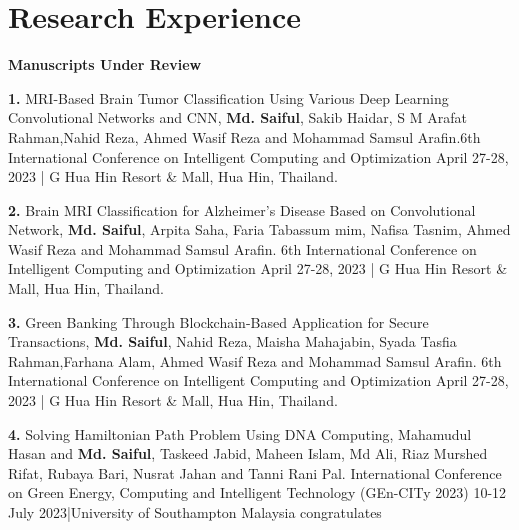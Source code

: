 \documentclass[letterpaper,11pt]{article}
\newcommand{\resumeSubHeadingListStart}{\begin{itemize}[leftmargin=0.15in, label={}]}
\newcommand{\resumeSubHeadingListEnd}{\end{itemize}}
\begin{document}
\section{Research Experience}
  \vspace{4pt}
  {\textbf{Manuscripts Under Review}
  \resumeSubHeadingListStart
    \small{\item{
        \textbf{1. }{ MRI-Based Brain Tumor Classification Using Various Deep Learning Convolutional Networks and CNN, \textbf{Md. Saiful}, Sakib Haidar, S M Arafat Rahman,Nahid Reza, Ahmed Wasif Reza and Mohammad Samsul Arafin.6th International Conference on Intelligent Computing and Optimization April 27-28, 2023 | G Hua Hin Resort \& Mall, Hua Hin, Thailand.} \\ \vspace{3pt}
    
        \textbf{2. } {Brain MRI Classification for Alzheimer's Disease Based on Convolutional Network, \textbf{Md. Saiful}, Arpita Saha, Faria Tabassum mim, Nafisa Tasnim, Ahmed Wasif Reza and Mohammad Samsul Arafin. 6th International Conference on Intelligent Computing and Optimization April 27-28, 2023 | G Hua Hin Resort \& Mall, Hua Hin, Thailand.} \\ \vspace{3pt}
        
        \textbf{3. } {Green Banking Through Blockchain-Based Application for Secure Transactions, \textbf{Md. Saiful}, Nahid Reza, Maisha Mahajabin, Syada Tasfia Rahman,Farhana Alam, Ahmed Wasif Reza and Mohammad Samsul Arafin. 6th International Conference on Intelligent Computing and Optimization April 27-28, 2023 | G Hua Hin Resort \& Mall, Hua Hin, Thailand.} \\ \vspace{3pt}

        \textbf{4. } {Solving Hamiltonian Path Problem Using DNA Computing, Mahamudul Hasan and \textbf{Md. Saiful}, Taskeed Jabid, Maheen Islam, Md Ali, Riaz Murshed Rifat, Rubaya Bari, Nusrat Jahan and Tanni Rani Pal. International Conference on Green Energy, Computing and Intelligent Technology (GEn-CITy 2023) 10-12 July 2023|University of Southampton Malaysia congratulates} \\ \vspace{3pt}
    }}
  \resumeSubHeadingListEnd






}
\end{document}
